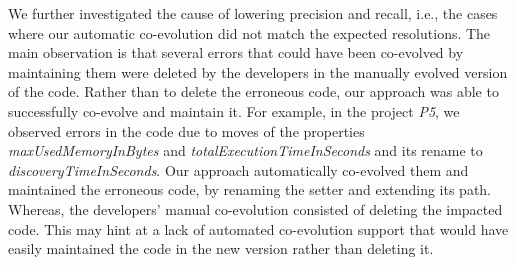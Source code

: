 	\begin{table}[t]
	\caption{Measured precision and recall of our projects.}
	\label{table:correctness}
	\end{table}
	
	
	
	We further investigated the cause of lowering precision and recall, i.e., the cases where our automatic co-evolution did not match the expected resolutions. 
	The main observation is that several errors that could have been co-evolved by maintaining them were deleted by the developers in the manually evolved version of the code. Rather than to delete the erroneous code, our approach was able to successfully co-evolve and maintain it. 
	For example, in the project \emph{P5}, we observed errors in the code due to moves of the properties \emph{maxUsedMemoryInBytes} and \emph{totalExecutionTimeInSeconds} and its rename to \emph{discoveryTimeInSeconds}. 
	Our approach automatically co-evolved them and maintained the erroneous code, by renaming the setter and extending its path. Whereas, the developers' manual co-evolution consisted of deleting the impacted code. This may hint at a lack of automated co-evolution support that would have easily maintained the code in the new version rather than deleting it.  
	

